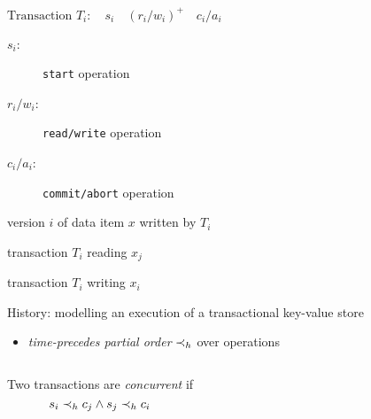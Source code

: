 \begin{frame}{}
  $\text{Transaction } T_i:\quad s_i\quad (r_i/w_i)^{+}\quad c_i/a_i$

  \begin{description}
    \item[$s_i$:] \texttt{start} operation
    \item[$r_i/w_i$:] \texttt{read/write} operation
    \item[$c_i/a_i$:] \texttt{commit/abort} operation
  \end{description}

  \pause
  \vspace{0.30cm}
  \begin{description}[$w_i(x_i)$:]
    \item[$x_i$:] version $i$ of data item $x$ written by $T_i$
    \item[$r_i(x_j)$:] transaction $T_i$ reading $x_j$
    \item[$w_i(x_i)$:] transaction $T_i$ writing $x_i$
  \end{description}
\end{frame}

\begin{frame}{}
  History: modelling an execution of a transactional key-value store
  \begin{itemize}
    \item \emph{time-precedes partial order} $\prec_{h}$ over operations
  \end{itemize}

  \pause
  \vspace{0.50cm}
  \begin{columns}
      Two transactions are \emph{concurrent} if
      \[
	s_i \prec_{h} c_j \land s_j \prec_{h} c_i
      \]
  \end{columns}
\end{frame}


